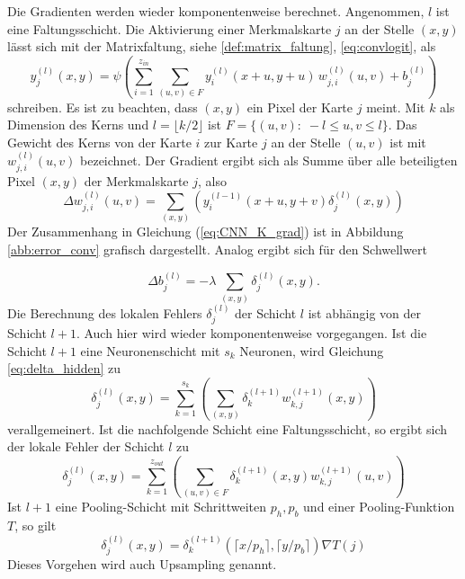 Die Gradienten werden wieder komponentenweise berechnet.
Angenommen, $l$ ist eine Faltungsschicht. Die Aktivierung einer Merkmalskarte $j$ an der Stelle $(x,y)$ lässt sich mit der Matrixfaltung, siehe \ref{def:matrix_faltung}, \ref{eq:convlogit}, als
\begin{equation}
    y_j^{(l)}(x,y) =\psi \left(\sum_{i=1}^{z_{in}} \sum_{(u,v) \in F} y_i^{(l)}(x+u,y+u)\,  w_{j,i}^{(l)}(u,v) +b_j^{(l)}\right)
\end{equation}   
schreiben. Es ist zu beachten, dass $(x,y)$ ein Pixel der Karte $j$ meint. Mit $k$ als Dimension des Kerns und $l=\lfloor k/2 \rfloor$ ist $F=\{(u,v): \; -l \leq u,v \leq l\}$.
Das Gewicht des Kerns von der Karte $i$ zur Karte $j$ an der Stelle $(u,v)$ ist mit $w^{(l)}_{j,i}(u,v)$ bezeichnet. Der Gradient ergibt sich als Summe über alle beteiligten Pixel $(x,y)$ der Merkmalskarte $j$, also
\begin{equation}
    \label{eq:CNN_K_grad}
    \Delta w_{j,i}^{(l)}(u,v)= \sum_{(x,y)} \left( y_i^{(l-1)}(x+u,y+v) \delta_j^{(l)}(x,y)\right)
\end{equation}
Der Zusammenhang in Gleichung (\ref{eq:CNN_K_grad}) ist in Abbildung \ref{abb:error_conv} grafisch dargestellt. Analog ergibt sich für den Schwellwert

\begin{equation*}
    \Delta b_j^{(l)}= -\lambda \, \sum_{(x,y)} \delta_j^{(l)}(x,y).
\end{equation*}
Die Berechnung des lokalen Fehlers $\delta_{j}^{(l)}$ der Schicht $l$ ist abhängig von der Schicht $l+1$. Auch hier wird wieder komponentenweise vorgegangen. Ist die Schicht $l+1$ eine Neuronenschicht mit $s_k$ Neuronen, wird Gleichung \ref{eq:delta_hidden} zu
\begin{equation*}
    \delta_j^{(l)}(x,y)=\sum_{k=1}^{s_{k}} \left(\sum_{(x,y)} \delta_k^{(l+1)} w_{k,j}^{(l+1)}(x,y)\right) 
\end{equation*}
verallgemeinert. Ist die nachfolgende Schicht eine Faltungsschicht, so ergibt sich der lokale Fehler der Schicht $l$ zu
\begin{equation*}
    \delta_j^{(l)}(x,y)=\sum_{k=1}^{z_{out}} \left(\sum_{(u,v) \in F} \delta_k^{(l+1)}(x,y) w_{k,j}^{(l+1)}(u,v)\right)
\end{equation*}
Ist $l+1$ eine Pooling-Schicht mit Schrittweiten $p_h,p_b$ und einer Pooling-Funktion $T$, so gilt
\begin{equation*}
    \delta_j^{(l)}(x,y)=\delta_k^{(l+1)}(\lceil x/p_h \rceil ,\lceil y/p_b \rceil) \nabla T(j)
\end{equation*}
Dieses Vorgehen wird auch Upsampling genannt.

